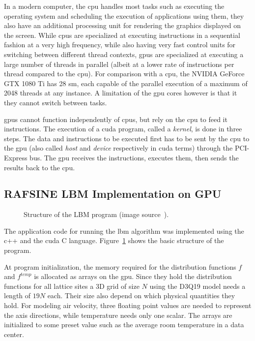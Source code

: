 In a modern computer, the \gls{cpu} handles most tasks such as executing the operating system and scheduling the execution of applications using them, they also have an additional processing unit for rendering the graphics displayed on the screen. While \gls{cpu}s are specialized at executing instructions in a sequential fashion at a very high frequency, while also having very fast control units for switching between different thread contexts, \gls{gpu}s are specialized at executing a large number of threads in parallel (albeit at a lower rate of instructions per thread compared to the \gls{cpu}). For comparison with a \gls{cpu}, the NVIDIA GeForce GTX 1080 Ti has 28 \gls{sm}, each capable of the parallel execution of a maximum of 2048 threads at any instance. A limitation of the \gls{gpu} cores however is that it they cannot switch between tasks.

\gls{gpu}s cannot function independently of \gls{cpu}s, but rely on the \gls{cpu} to feed it instructions. The execution of a \gls{cuda} program, called a \textit{kernel}, is done in three steps. The data and instructions to be executed first has to be sent by the \gls{cpu} to the \gls{gpu} (also called \textit{host} and \textit{device} respectively in \gls{cuda} terms) through the PCI-Express bus. The \gls{gpu} receives the instructions, executes them, then sends the results back to the \gls{cpu}.

\subsection{RAFSINE LBM Implementation on GPU} \label{sec:lbm_impl}
\begin{figure}[!htb]
\centering
\begin{small}
\def\svgwidth{0.7\linewidth}

\end{small}
\caption{Structure of the LBM program (image source~\cites[pg.79]{Delbosc}).}
\label{fig:lbm-core}
\end{figure}
The application code for running the \gls{lbm} algorithm was implemented using the \gls{c++} and the \gls{cuda} C language. Figure~\ref{fig:lbm-core} shows the basic structure of the program. 

At program initialization, the memory required for the distribution functions $f$ and $f^{temp}$ is allocated as arrays on the \gls{gpu}. Since they hold the distribution functions for all lattice sites a 3D grid of size $N$ using the D3Q19 model needs a length of $19N$ each. Their size also depend on which physical quantities they hold. For modeling air velocity, three floating point values are needed to represent the axis directions, while temperature needs only one scalar. The arrays are initialized to some preset value such as the average room temperature in a data center.

